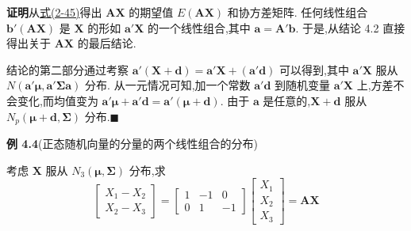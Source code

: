 \noindent\textbf{证明}\quad 从\hyperref[eq:2-45]{式(2-45)}得出 $\mathbf{A}\mathbf{X}$ 的期望值 $E(\mathbf{A}\mathbf{X})$ 和协方差矩阵. 任何线性组合 $\mathbf{b}'(\mathbf{A}\mathbf{X})$ 是 $\mathbf{X}$ 的形如 $\mathbf{a}'\mathbf{X}$ 的一个线性组合,其中 $\mathbf{a}=\mathbf{A}'\mathbf{b}$. 于是,从结论 4.2 直接得出关于 $\mathbf{A}\mathbf{X}$ 的最后结论.

结论的第二部分通过考察 $\mathbf{a}'(\mathbf{X}+\mathbf{d})=\mathbf{a}'\mathbf{X}+(\mathbf{a}'\mathbf{d})$ 可以得到,其中 $\mathbf{a}'\mathbf{X}$ 服从 $N(\mathbf{a}'\boldsymbol{\mu},\mathbf{a}'\boldsymbol{\Sigma}\mathbf{a})$ 分布. 从一元情况可知,加一个常数 $\mathbf{a}'\mathbf{d}$ 到随机变量 $\mathbf{a}'\mathbf{X}$ 上,方差不会变化,而均值变为 $\mathbf{a}'\boldsymbol{\mu}+\mathbf{a}'\mathbf{d}=\mathbf{a}'(\boldsymbol{\mu}+\mathbf{d})$. 由于 $\mathbf{a}$ 是任意的,$\mathbf{X}+\mathbf{d}$ 服从 $N_p(\boldsymbol{\mu}+\mathbf{d},\boldsymbol{\Sigma})$ 分布.\hfill$\blacksquare$

\noindent\textbf{例 4.4}\quad (正态随机向量的分量的两个线性组合的分布)

考虑 $\mathbf{X}$ 服从 $N_3(\boldsymbol{\mu},\boldsymbol{\Sigma})$ 分布,求
\[
\begin{bmatrix}X_1-X_2\\X_2-X_3\end{bmatrix}=\begin{bmatrix}1&-1&0\\0&1&-1\end{bmatrix}\begin{bmatrix}X_1\\X_2\\X_3\end{bmatrix}=\mathbf{A}\mathbf{X}
\]
